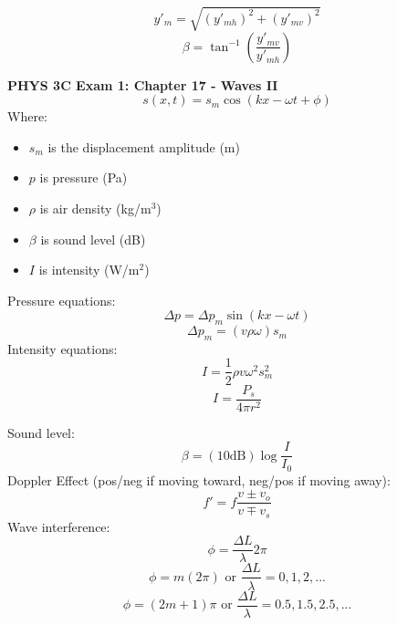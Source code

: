 \documentclass[11pt]{article}
\begin{document}
    \begin{equation}
        y'_{m} = \sqrt{(y'_{mh})^2 + (y'_{mv})^2} \tag{net amplitude}
    \end{equation}
    \begin{equation}
        \beta = \tan^{-1}({\frac{y'_{mv}}{y'_{mh}}}) \tag{net phase constant}
    \end{equation}

    \newpage
    \noindent \textbf{PHYS 3C Exam 1: Chapter 17 - Waves II}
    \begin{equation}
        s(x,t) = s_m\cos(kx - \omega t + \phi) \tag{sound equation}
    \end{equation}
    \noindent Where:
    \begin{itemize}
        \item $s_m$ is the displacement amplitude (m)
        \item $p$ is pressure (Pa)
        \item $\rho$ is air density (kg/m$^3$)
        \item $\beta$ is sound level (dB)
        \item $I$ is intensity (W/m$^2$)
    \end{itemize}
    \noindent Pressure equations:
    \begin{equation}
        \Delta p = \Delta p_m \sin(kx - \omega t) \tag{pressure change}
    \end{equation}
    \begin{equation}
        \Delta p_m = (v \rho \omega)s_m \tag{pressure amplitude}
    \end{equation}
    \noindent Intensity equations:
    \begin{equation}
        I = \frac{1}{2} \rho v \omega^2 s_{m}^2 \tag{intensity}\label{eq:intensity}
    \end{equation}
    \begin{equation}
        I = \frac{P_s}{4 \pi r^2} \tag{intensity at distance r}
    \end{equation}

    \noindent Sound level:
    \begin{equation}
        \beta = (10 \text{dB}) \log \frac{I}{I_0} \tag{sound level}
    \end{equation}
    \noindent Doppler Effect (pos/neg if moving toward, neg/pos if moving away):
    \begin{equation}
        f' = f \frac{v \pm v_o}{v \mp v_s }  \tag{Doppler Effect}\label{doppler}
    \end{equation}
    \noindent Wave interference:
    \begin{equation}
        \phi = \frac{\Delta L}{\lambda} 2 \pi \tag{phase difference}
    \end{equation}
    \begin{equation}
        \phi = m(2\pi) \text{ or } \frac{\Delta L}{\lambda} = 0,1,2,... \tag{fully constructive}
    \end{equation}
    \begin{equation}
        \phi = (2m+1)\pi \text{ or } \frac{\Delta L}{\lambda} = 0.5,1.5,2.5,... \tag{fully destructive}
    \end{equation}
\end{document}
